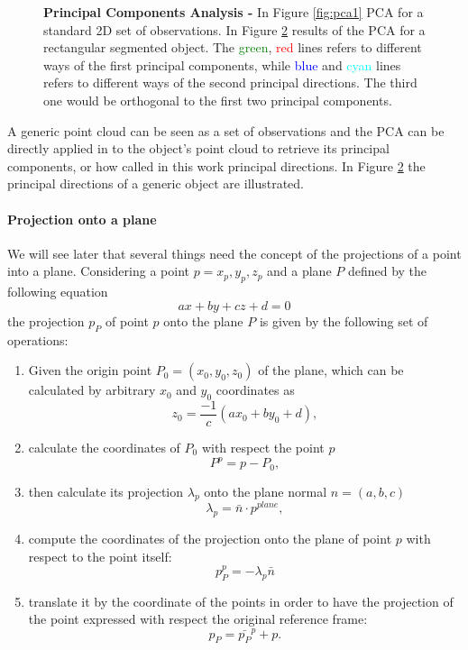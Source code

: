 \begin{figure}[h]
\begin{subfigure}[t]{0.45\textwidth}
\caption{}\label{fig:pca2}
\end{subfigure}
\caption{\textbf{Principal Components Analysis -} In Figure \ref{fig:pca1} PCA for a standard 2D set of observations. In Figure \ref{fig:pca2} results of the PCA for a rectangular segmented object. The \textcolor{green}{green}, \textcolor{red}{red} lines refers to different ways of the first principal components, while \textcolor{blue}{blue} and \textcolor{cyan}{cyan} lines refers to different ways of the second principal directions. The third one would be orthogonal to the first two principal components.}
\end{figure}

A generic point cloud can be seen as a set of observations and the PCA can be directly applied in to the object's point cloud to retrieve its principal components, or how called in this work principal directions. In Figure \ref{fig:pca2} the principal directions of a generic object are illustrated. 

\paragraph{Projection onto a plane}
We will see later that several things need the concept of the projections of a point into a plane. Considering a point $p={x_p,y_p,z_p}$ and a plane $P$ defined by the following equation
\begin{equation}
a x + by + cz + d = 0
\end{equation}
the projection $p_P$ of point $p$ onto the plane $P$ is given by the following set of operations:
\begin{enumerate}
\item Given the origin point $P_0=(x_0,y_0,z_0)$ of the plane, which can be calculated by arbitrary $x_0$ and $y_0$ coordinates as
\[
z_0 = \frac{-1}{c}(ax_0 + by_0 + d),
\]
\item calculate the coordinates of $P_0$ with respect the point $p$
\[
P^{p} = p - P_0,
\]
\item then calculate its projection $\lambda_p$ onto the plane normal $n=(a,b,c)$
\[
\lambda_p = \bar{n} \cdot p^{plane}, 
\]
\item compute the coordinates of the projection onto the plane of point $p$ with respect to the point itself:
\[
p_P^p = - \lambda_p \bar{n}
\]
\item translate it by the coordinate of the points in order to have the projection of the point expressed with respect the original reference frame:
\[
p_P = \bar{p_P}^p + p. 
\]
\end{enumerate}

